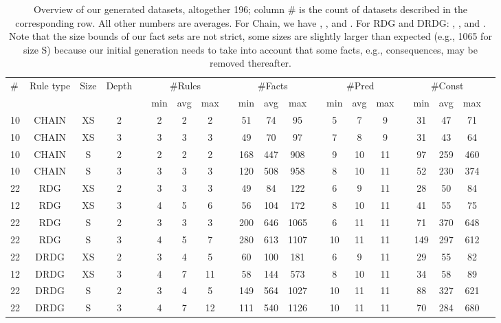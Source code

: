 \documentclass[letterpaper]{article} \usepackage{aaai20}  \usepackage{times}  \usepackage{helvet} \usepackage{courier}  \usepackage[hyphens]{url}  \usepackage{graphicx} \urlstyle{rm} \def\UrlFont{\rm}  \usepackage{graphicx}  \frenchspacing  \setlength{\pdfpagewidth}{8.5in}  \setlength{\pdfpageheight}{11in}  \usepackage{amsthm}
\theoremstyle{definition}
\begin{document}
\begin{table*}[t!]
    \centering
    \small
\begin{tabular}{lcccccccccccccccccccc}
    \toprule
     \multirow{2}{*}{\#} & \multirow{2}{*}{Rule type}   & \multirow{2}{*}{Size} & \multirow{2}{*}{Depth} &&  \multicolumn{3}{c}{\#Rules} &&\multicolumn{3}{c}{\#Facts} 
      &&\multicolumn{3}{c}{\#Pred} && \multicolumn{3}{c}{\#Const} \\ 
      \cmidrule{6-8}
      \cmidrule{10-12}
      \cmidrule{14-16}
      \cmidrule{18-20}
      &&& 
      && min&avg&max
      & &min&avg&max
      & &min&avg&max
      & &min&avg&max
      \\
\midrule
     10 &CHAIN  &   XS & 2 &&2&2&2 && 51&74&95 && 5&7&9 && 31&47&71  \\
          10 &CHAIN  &   XS & 3 &&3&3&3& & 49&70&97 && 7&8&9 && 31&43&64 \\
     10 & CHAIN  & S & 2  && 2&2&2 && 168&447&908 && 9&10&11 && 97&259&460\\
      10 &CHAIN  & S &  3 && 3&3&3 && 120&508&958 & &8&10&11 && 52&230&374\\
     \midrule
    22 & RDG  &  XS & 2  && 3&3&3 && 49&84&122 && 6&9&11 && 28&50&84 \\ 
     12 & RDG  &  XS & 3  && 4&5&6 && 56&104&172 && 8&10&11 && 41&55&75 \\
     22 &  RDG  & S & 2 && 3&3&3 && 200&646&1065 && 6&11&11 && 71&370&648   \\
     22 &RDG  &  S & 3 && 4&5&7 && 280&613&1107 && 10&11&11 && 149&297&612   \\
     \midrule
     22 &DRDG &  XS & 2  && 3&4&5 && 60&100&181 && 6&9&11 && 29&55&82    \\
     12 &DRDG &  XS &3  && 4&7&11 && 58&144&573 && 8&10&11 && 34&58&89   \\
     22 &DRDG &  S &2 && 3&4&5 && 149&564&1027 && 10&11&11 && 88&327&621   \\
     22 &DRDG &  S &3 && 4&7&12 && 111&540&1126 && 10&11&11 && 70&284&680   \\
\bottomrule
    \end{tabular}
    \caption{Overview of our generated datasets, altogether 196;
    column \# is the count of datasets described in the corresponding row.
    All other numbers are averages.
    For Chain, we have , , and .
    For RDG and DRDG:
, , and .
Note that the size bounds of our fact sets are not strict, some sizes are slightly larger than expected (e.g., 1065 for size S) because our initial generation needs to take into account that some facts, e.g., consequences, may be removed thereafter. 
    }
    \label{tab:datasets}
\end{table*}
\end{document}
